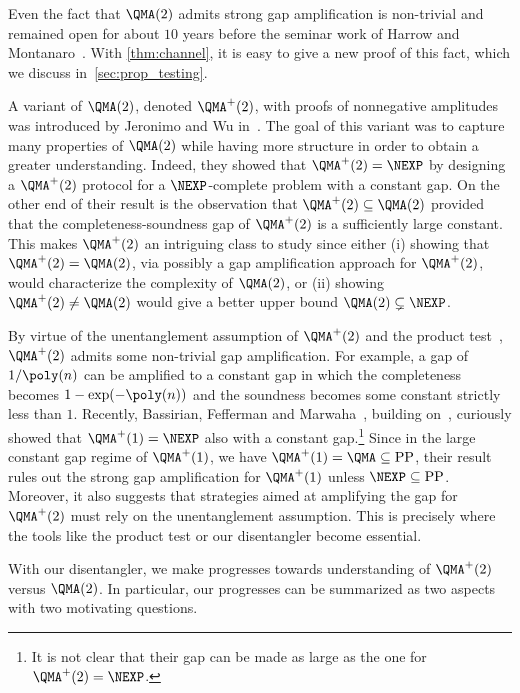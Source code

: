 Even the fact that $\QMA(2)$ admits strong gap amplification is non-trivial and remained open for
about $10$ years before the seminar work of Harrow and Montanaro~\cite{HM13}.
%
With \cref{thm:channel}, it is easy to give a new proof of this fact, which we discuss
in~\cref{sec:prop_testing}. 

A variant of $\QMA(2)$, denoted $\QMA^+(2)$, with proofs of nonnegative amplitudes
was introduced by Jeronimo and Wu in~\cite{JW23}.
%
The goal of this variant was to capture many properties of $\QMA(2)$ while having more
structure in order to obtain a greater understanding.
%
Indeed, they showed that $\QMA^+(2)=\NEXP$ by designing a $\QMA^+(2)$ protocol for a $\NEXP$-complete problem with a constant gap.
%
On the other end of their result is the observation that $\QMA^+(2)\subseteq\QMA(2)$
provided that the completeness-soundness gap of $\QMA^+(2)$ is a sufficiently large constant.
%
This makes $\QMA^+(2)$ an intriguing class to study since either (i) showing that $\QMA^+(2)=\QMA(2)$, via possibly a gap amplification approach for $\QMA^+(2)$,
would characterize the complexity of $\QMA(2)$, or (ii) showing $\QMA^+(2) \ne \QMA(2)$ would
give a better upper bound $\QMA(2) \subsetneq \NEXP$.
%

By virtue of the unentanglement assumption of $\QMA^+(2)$ and the product test~\cite{HM13},
$\QMA^+(2)$ admits some non-trivial gap amplification.
%
For example, a gap of $1/\poly(n)$ can be amplified to a constant gap in which the completeness
becomes $1-\exp(-\poly(n))$ and the soundness becomes some constant strictly less than $1$.
%
Recently, Bassirian, Fefferman and Marwaha~\cite{bassirian2023quantum}, building on~\cite{JW23},
curiously showed that $\QMA^+(1)=\NEXP$ also with a constant gap.\footnote{It is not clear that
their gap can be made as large as the one for $\QMA^+(2)=\NEXP$.}
%
Since in the large constant gap regime of $\QMA^+(1)$, we have $\QMA^+(1)=\QMA \subseteq \textup{PP}$,
their result rules out the strong gap amplification for $\QMA^+(1)$ unless $\NEXP\subseteq\textup{PP}$.
%
Moreover, it also suggests that strategies aimed at amplifying the gap for $\QMA^+(2)$ must rely on
the unentanglement assumption.
%
This is precisely where the tools like the product test or our disentangler become essential.

With our disentangler, we make progresses towards understanding of $\QMA^+(2)$ versus $\QMA(2)$.
%
In particular, our progresses can be summarized as two aspects with two motivating questions.

